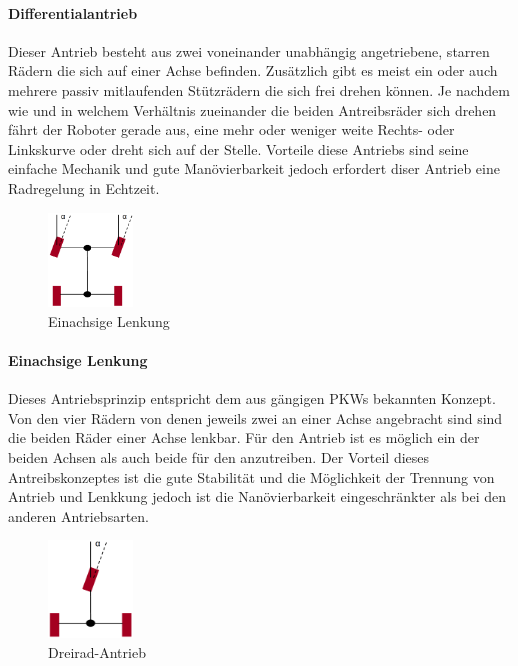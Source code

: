 \paragraph{Differentialantrieb}
\color{process}
Dieser Antrieb besteht aus zwei voneinander unabhängig angetriebene, starren Rädern die sich auf einer Achse befinden. Zusätzlich gibt es meist ein oder auch mehrere passiv mitlaufenden Stützrädern die sich frei drehen können. Je nachdem wie und in welchem Verhältnis zueinander die beiden Antreibsräder sich drehen fährt der Roboter gerade aus, eine mehr oder weniger weite Rechts- oder Linkskurve oder dreht sich auf der Stelle.
\newline
Vorteile diese Antriebs sind seine einfache Mechanik und gute Manövierbarkeit jedoch erfordert diser Antrieb eine Radregelung in Echtzeit.
\begin{figure}
	\vspace{-0.75cm}
	\begin{center}
		\includegraphics[width=0.20\textwidth]{images/technische_grundlagen/Einachsenlenkung.png}
	\end{center}
	\caption{Einachsige Lenkung}
	\label{fig:einachsenlenkung}
\end{figure}
\paragraph{Einachsige Lenkung}
\color{process}
Dieses Antriebsprinzip entspricht dem aus gängigen PKWs bekannten Konzept. Von den vier Rädern von denen jeweils zwei an einer Achse angebracht sind sind die beiden Räder einer Achse lenkbar. Für den Antrieb ist es möglich ein der beiden Achsen als auch beide für den anzutreiben. 
\newline
Der Vorteil dieses Antreibskonzeptes ist die gute Stabilität und die Möglichkeit der Trennung von Antrieb und Lenkkung jedoch ist die Nanövierbarkeit eingeschränkter als bei den anderen Antriebsarten.
\pagebreak
\begin{figure}
	\vspace{+0.25cm}
	\begin{center}
		\includegraphics[width=0.20\textwidth]{images/technische_grundlagen/Dreiradantrieb.png}
	\end{center}
	\caption{Dreirad-Antrieb}
	\label{fig:einachsenlenkung}
\end{figure}
